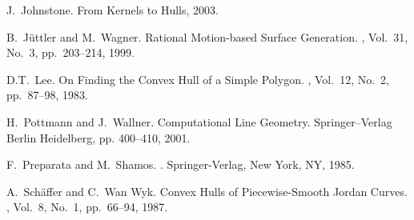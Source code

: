 \documentclass{elsart}
\begin{document}
\begin{thebibliography}{}
J.~Johnstone.  From Kernels to Hulls, 2003.

B.~J\"uttler and M.~Wagner.
\newblock Rational Motion-based Surface Generation.
,
Vol.~31, No.~3, pp.~203--214, 1999.

D.T.~Lee.
\newblock On Finding the Convex Hull of a Simple Polygon.
,
Vol.~12, No.~2, pp.~87--98, 1983.

H.~Pottmann and J.~Wallner.
\newblock Computational Line Geometry.
\newblock Springer--Verlag Berlin Heidelberg, pp. 400--410, 2001.

F.~Preparata and M.~Shamos.
.
\newblock Springer-Verlag, New York, NY, 1985.

A.~Sch\"affer and C.~Wan Wyk.
\newblock Convex Hulls of Piecewise-Smooth Jordan Curves.
, Vol.~8, No.~1, pp.~66--94, 1987.

\end{thebibliography}

\end{document}
